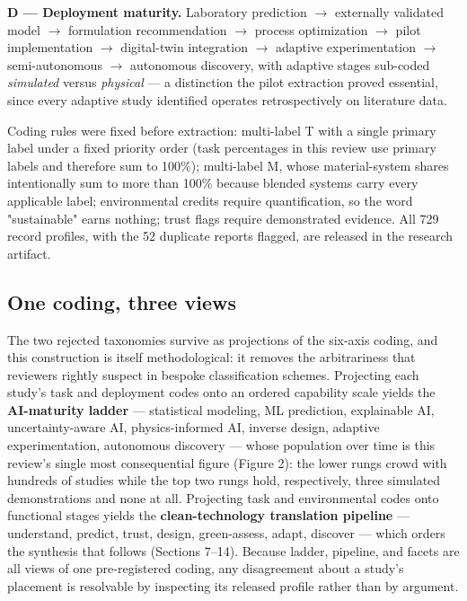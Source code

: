 \documentclass[pdflatex,sn-basic]{sn-jnl}
\begin{document}
\textbf{D --- Deployment maturity.} Laboratory prediction $\rightarrow$ externally validated model $\rightarrow$ formulation recommendation $\rightarrow$ process optimization $\rightarrow$ pilot implementation $\rightarrow$ digital-twin integration $\rightarrow$ adaptive experimentation $\rightarrow$ semi-autonomous $\rightarrow$ autonomous discovery, with adaptive stages sub-coded \emph{simulated} versus \emph{physical} --- a distinction the pilot extraction proved essential, since every adaptive study identified operates retrospectively on literature data.

Coding rules were fixed before extraction: multi-label T with a single primary label under a fixed priority order (task percentages in this review use primary labels and therefore sum to 100\%); multi-label M, whose material-system shares intentionally sum to more than 100\% because blended systems carry every applicable label; environmental credits require quantification, so the word "sustainable" earns nothing; trust flags require demonstrated evidence. All 729 record profiles, with the 52 duplicate reports flagged, are released in the research artifact.

\subsection{One coding, three views}

The two rejected taxonomies survive as projections of the six-axis coding, and this construction is itself methodological: it removes the arbitrariness that reviewers rightly suspect in bespoke classification schemes. Projecting each study's task and deployment codes onto an ordered capability scale yields the \textbf{AI-maturity ladder} --- statistical modeling, ML prediction, explainable AI, uncertainty-aware AI, physics-informed AI, inverse design, adaptive experimentation, autonomous discovery --- whose population over time is this review's single most consequential figure (Figure 2): the lower rungs crowd with hundreds of studies while the top two rungs hold, respectively, three simulated demonstrations and none at all. Projecting task and environmental codes onto functional stages yields the \textbf{clean-technology translation pipeline} --- understand, predict, trust, design, green-assess, adapt, discover --- which orders the synthesis that follows (Sections 7--14). Because ladder, pipeline, and facets are all views of one pre-registered coding, any disagreement about a study's placement is resolvable by inspecting its released profile rather than by argument.
\end{document}
